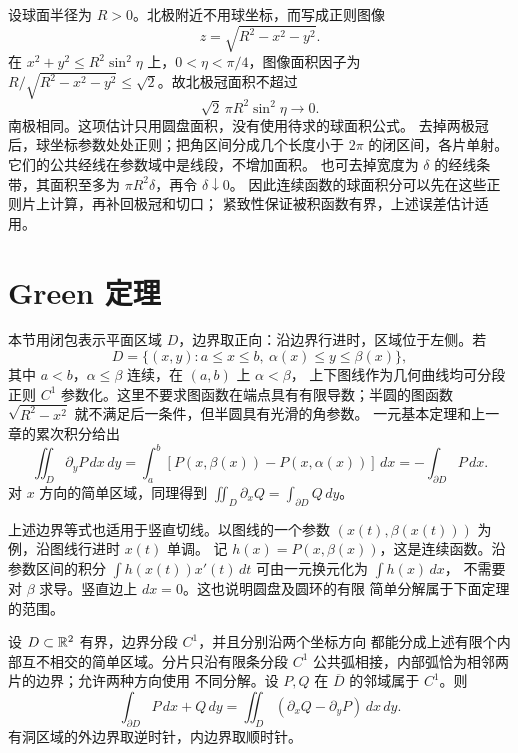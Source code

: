 \begin{example}[球坐标的极点与切口]
\label{ex:sphere-polar-cap-control}
设球面半径为 $R>0$。北极附近不用球坐标，而写成正则图像
\[
 z=\sqrt{R^2-x^2-y^2}.
\]
在 $x^2+y^2\le R^2\sin^2\eta$ 上，$0<\eta<\pi/4$，图像面积因子为
$R/\sqrt{R^2-x^2-y^2}\le\sqrt2$。故北极冠面积不超过
\[
 \sqrt2\,\pi R^2\sin^2\eta\longrightarrow0.
\]
南极相同。这项估计只用圆盘面积，没有使用待求的球面积公式。
去掉两极冠后，球坐标参数处处正则；把角区间分成几个长度小于 $2\pi$
的闭区间，各片单射。它们的公共经线在参数域中是线段，不增加面积。
也可去掉宽度为 $\delta$ 的经线条带，其面积至多为
$\pi R^2\delta$，再令 $\delta\downarrow0$。
因此连续函数的球面积分可以先在这些正则片上计算，再补回极冠和切口；
紧致性保证被积函数有界，上述误差估计适用。
\end{example}

\section{Green 定理}

本节用闭包表示平面区域 \(D\)，边界取正向：沿边界行进时，区域位于左侧。若
\[
 D=\{(x,y):a\le x\le b,\ \alpha(x)\le y\le\beta(x)\},
\]
其中 $a<b$，\(\alpha\le\beta\) 连续，在 $(a,b)$ 上 $\alpha<\beta$，
上下图线作为几何曲线均可分段正则
\(C^1\) 参数化。这里不要求图函数在端点具有有限导数；半圆的图函数
\(\sqrt{R^2-x^2}\) 就不满足后一条件，但半圆具有光滑的角参数。
一元基本定理和上一章的累次积分给出
\[
 \iint_D\partial_yP\,dx\,dy
 =\int_a^b[P(x,\beta(x))-P(x,\alpha(x))]\,dx
 =-\int_{\partial D}P\,dx.
\]
对 \(x\) 方向的简单区域，同理得到
\(\iint_D\partial_xQ=\int_{\partial D}Q\,dy\)。

上述边界等式也适用于竖直切线。以图线的一个参数
\((x(t),\beta(x(t)))\) 为例，沿图线行进时 $x(t)$ 单调。
记 $h(x)=P(x,\beta(x))$，这是连续函数。沿参数区间的积分
$\int h(x(t))x'(t)\,dt$ 可由一元换元化为 $\int h(x)\,dx$，
不需要对 $\beta$ 求导。竖直边上 $dx=0$。这也说明圆盘及圆环的有限
简单分解属于下面定理的范围。

\begin{theorem}[Green 定理]
\label{thm:green-classical}
设 \(D\subset\mathbb{R}^2\) 有界，边界分段 \(C^1\)，并且分别沿两个坐标方向
都能分成上述有限个内部互不相交的简单区域。分片只沿有限条分段
\(C^1\) 公共弧相接，内部弧恰为相邻两片的边界；允许两种方向使用
不同分解。设 \(P,Q\) 在
\(\overline D\) 的邻域属于 \(C^1\)。则
\[
 \int_{\partial D}P\,dx+Q\,dy
 =\iint_D(\partial_xQ-\partial_yP)\,dx\,dy.
\]
有洞区域的外边界取逆时针，内边界取顺时针。
\end{theorem}

